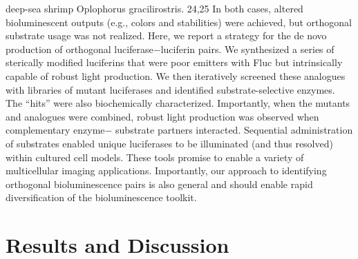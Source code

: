 deep-sea shrimp Oplophorus gracilirostris.
24,25 In both cases,
altered bioluminescent outputs (e.g., colors and stabilities) were
achieved, but orthogonal substrate usage was not realized.
Here, we report a strategy for the de novo production of
orthogonal luciferase−luciferin pairs. We synthesized a series of
sterically modified luciferins that were poor emitters with Fluc
but intrinsically capable of robust light production. We then
iteratively screened these analogues with libraries of mutant
luciferases and identified substrate-selective enzymes. The
“hits” were also biochemically characterized. Importantly,
when the mutants and analogues were combined, robust light
production was observed when complementary enzyme−
substrate partners interacted. Sequential administration of
substrates enabled unique luciferases to be illuminated (and
thus resolved) within cultured cell models. These tools promise
to enable a variety of multicellular imaging applications.
Importantly, our approach to identifying orthogonal bioluminescence
pairs is also general and should enable rapid
diversification of the bioluminescence toolkit.

\section{Results and Discussion}

